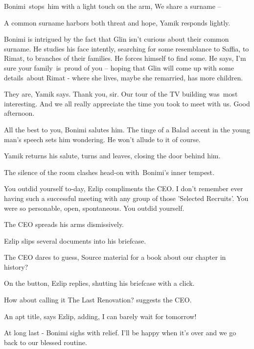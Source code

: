 \documentclass[twoside,11pt]{book}
\begin{document}
Bonimi{\ }stops{\ }him with a light touch on the arm, {\textquotedbl}We share a surname
--{\textquotedbl} 

{\textquotedbl}A common surname harbors both threat and hope,{\textquotedbl} Yamik responds lightly.

Bonimi is intrigued by the fact that Glin isn't curious about their common surname. He studies his face intently,
searching for some resemblance to Saffia, to Rimat, to branches of their families. He forces himself to find some. He
says, {\textquotedbl}I'm sure your family{\ }is\ proud of you --{\textquotedbl} hoping that Glin will
come up with some details~about Rimat - where she lives, maybe she remarried, has more children. 

{\textquotedbl}They are,{\textquotedbl} Yamik says. {\textquotedbl}Thank you, sir. Our tour of the TV building was\ most
interesting. And we all really appreciate the time you took to meet with us. Good afternoon.{\textquotedbl} 

{\textquotedbl}All the best to you,{\textquotedbl} Bonimi salutes him. The tinge of a Balad accent in the young man's
speech sets him wondering. He won't allude to it of course. 

Yamik returns his salute, turns and leaves, closing the door behind him.

The silence of the room clashes head-on with~Bonimi's inner tempest.

{\textquotedbl}You outdid yourself to-day,{\textquotedbl} Ezlip compliments the CEO. {\textquotedbl}I don't remember
ever having such a successful meeting with any group of those {}'Selected Recruits{}'. You were so personable, open,
spontaneous. You outdid yourself.{\textquotedbl}

The CEO spreads his arms dismissively. 

Ezlip slips several documents into his briefcase.\textbf{\ }

The CEO dares to guess, {\textquotedbl}Source material for a book about our chapter in history?{\textquotedbl} 

{\textquotedbl}On the button,{\textquotedbl} Ezlip replies, shutting his briefcase with a click. 

{\textquotedbl}How about calling it The Last Renovation?{\textquotedbl} suggests the CEO. 

{\textquotedbl}An apt title,{\textquotedbl} says Ezlip, adding, {\textquotedbl}I can barely wait for
tomorrow!{\textquotedbl}

{\textquotedbl}At long last -{\textquotedbl} Bonimi sighs with relief. {\textquotedbl}I'll be happy when it's over and
we go back to our blessed routine.{\textquotedbl}
\end{document}
